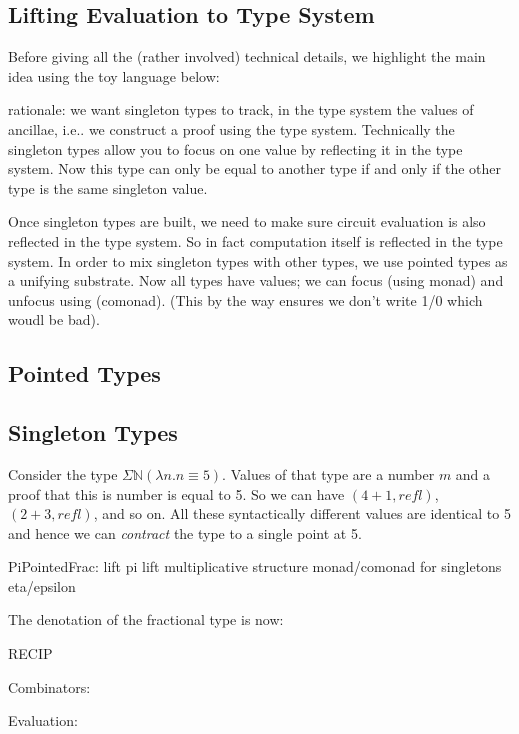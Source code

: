 \documentclass[sigplan,10pt,review,anonymous]{acmart}
\begin{document}
\subsection{Lifting Evaluation to Type System}

Before giving all the (rather involved) technical details, we
highlight the main idea using the toy language below:

\Jexample{}

rationale: we want singleton types to track, in the type system
the values of ancillae, i.e.. we construct a proof using the type
system. Technically the singleton types allow you to focus on one
value by reflecting it in the type system. Now this type can only be
equal to another type if and only if the other type is the same
singleton value.

Once singleton types are built, we need to make sure circuit
evaluation is also reflected in the type system. So in fact
computation itself is reflected in the type system. In order to mix
singleton types with other types, we use pointed types as a unifying
substrate. Now all types have values; we can focus (using monad) and
unfocus using (comonad). (This by the way ensures we don't write 1/0
which woudl be bad). 

\subsection{Pointed Types}
 
\subsection{Singleton Types}
 
Consider the type $\Sigma \mathbb{N} (\lambda n. n \equiv 5)$. Values
of that type are a number $m$ and a proof that this is number is equal
to 5. So we can have $(4 + 1, \textit{refl})$, $(2 + 3 ,
\textit{refl})$, and so on. All these syntactically different values
are identical to 5 and hence we can \emph{contract} the type to a
single point at 5. 

PiPointedFrac:
lift pi
lift multiplicative structure
monad/comonad for singletons
eta/epsilon

The denotation of the fractional type is now:

\PIPFUdef{}

RECIP 

Combinators:
\PIPFCombDef{}

Evaluation:
\PIPFeval{}
\end{document}

